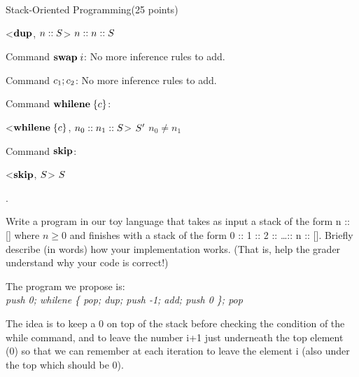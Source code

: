 \documentclass{article}
\begin{document}
\begin{question}{Stack-Oriented Programming}{(25 points)}
\begin{subquestion}
\begin{subsubquestion}
      \infrule[DUP]
      {
      	
      }
      {
      	<$\mathbf{dup}$, $n :: S$> \stepsto $n :: n :: S$
      }
      {
      }
    \end{subsubquestion}
    \begin{subsubquestion}
      Command $\mathbf{swap}\;{i}$: No more inference rules to add.
    \end{subsubquestion}
    \begin{subsubquestion}
      Command $c_1; c_2$: No more inference rules to add.
    \end{subsubquestion}
    \begin{subsubquestion}
      Command $\mathbf{whilene}\;\{c\}$: 
      
      {
      	<$\mathbf{whilene}\;\{c\}$, $n_0 :: n_1 :: S$> \stepsto $S'$
      }
      {
      	$n_0 \ne n_1$
      }
      
    \end{subsubquestion}
    \begin{subsubquestion}
      Command $\mathbf{skip}$: 
      
      \infrule[SKIP]
      {
      	
      }
      {
      	<$\mathbf{skip}$, $S$> \stepsto $S$
      }
      {
      }
    \end{subsubquestion}

  \end{subquestion}

  \begin{subquestion}
    .
  \end{subquestion}
  
  \begin{subquestion}
 Write a program in our toy language that takes as input a stack of the form n :: [] where $n \geq 0$ and
finishes with a stack of the form 0 :: 1 :: 2 :: \dots :: n :: []. Briefly describe (in words) how your
implementation works. (That is, help the grader understand why your code is correct!)

The program we propose is:\\
 \emph{push 0; whilene \{ pop; dup; push -1; add; push 0 \}; pop}
 
 The idea is to keep a 0 on top of the stack before checking the condition of the while command, and to leave the number i+1 just underneath the top element (0) so that we can remember at each iteration to leave the element i (also under the top which should be 0).
 

\end{subquestion}
\end{question}
\end{document}
